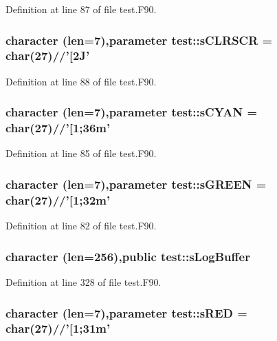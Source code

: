 Definition at line 87 of file test.F90.

\hypertarget{namespacetest_a9400b0462b1b2636c59786f754d01c32}{
\subsubsection[{sCLRSCR}]{\setlength{\rightskip}{0pt plus 5cm}character (len=7),parameter {\bf test::sCLRSCR} = char(27)//'\mbox{[}2J'}}
\label{namespacetest_a9400b0462b1b2636c59786f754d01c32}


Definition at line 88 of file test.F90.

\hypertarget{namespacetest_adc949307b4c1c64ca9c4680cb1772584}{
\subsubsection[{sCYAN}]{\setlength{\rightskip}{0pt plus 5cm}character (len=7),parameter {\bf test::sCYAN} = char(27)//'\mbox{[}1;36m'}}
\label{namespacetest_adc949307b4c1c64ca9c4680cb1772584}


Definition at line 85 of file test.F90.

\hypertarget{namespacetest_a51f6a60bb17f75fd328f4ebec7c8fdc9}{
\subsubsection[{sGREEN}]{\setlength{\rightskip}{0pt plus 5cm}character (len=7),parameter {\bf test::sGREEN} = char(27)//'\mbox{[}1;32m'}}
\label{namespacetest_a51f6a60bb17f75fd328f4ebec7c8fdc9}


Definition at line 82 of file test.F90.

\hypertarget{namespacetest_afa1c66465bae9135884cfa7867b9df30}{
\subsubsection[{sLogBuffer}]{\setlength{\rightskip}{0pt plus 5cm}character (len=256),public {\bf test::sLogBuffer}}}
\label{namespacetest_afa1c66465bae9135884cfa7867b9df30}


Definition at line 328 of file test.F90.

\hypertarget{namespacetest_ad68d7758d8be0c0e11554d320e7fe361}{
\subsubsection[{sRED}]{\setlength{\rightskip}{0pt plus 5cm}character (len=7),parameter {\bf test::sRED} = char(27)//'\mbox{[}1;31m'}}
\label{namespacetest_ad68d7758d8be0c0e11554d320e7fe361}


